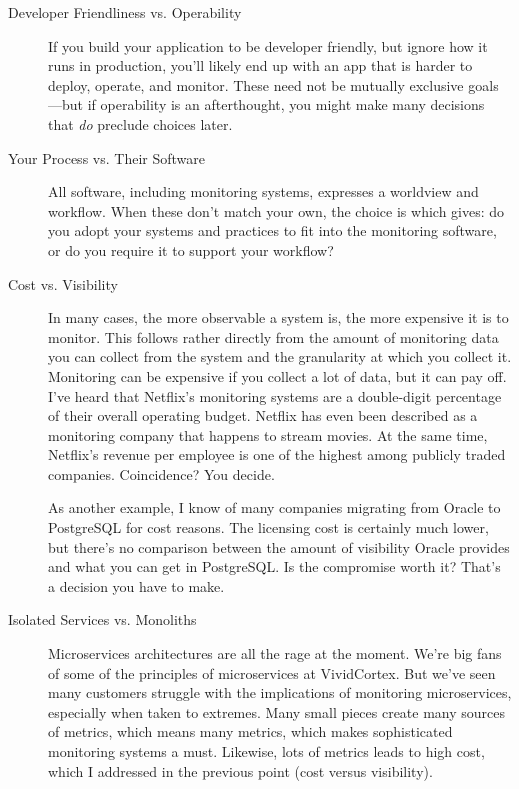 \documentclass{vivid_layout}
\begin{document}
\begin{description}

\item[Developer Friendliness vs. Operability] If you build your application to be
developer friendly, but ignore how it runs in production, you'll
likely end up with an app that is harder to deploy, operate, and monitor. These need not
be mutually exclusive goals---but if operability is an afterthought, you might
make many decisions that \emph{do} preclude choices later.

\item[Your Process vs. Their Software] All software, including monitoring
systems, expresses a worldview and workflow. When these don't match your own,
the choice is which gives: do you adopt your systems and practices to fit into
the monitoring software, or do you require it to support your workflow?

\item[Cost vs. Visibility] In many cases, the more observable a system is, the
more expensive it is to monitor. This follows rather directly from the amount of
monitoring data you can collect from the system and the granularity at which you
collect it. Monitoring can be expensive if you collect a lot of data, but it can
pay off. I've heard that Netflix's monitoring systems are a double-digit
percentage of their overall operating budget. Netflix has even been described as
a monitoring company that happens to stream movies. At the same time, Netflix's
revenue per employee is one of the highest among publicly traded companies.
Coincidence? You decide.

As another example, I know of many companies migrating from Oracle to PostgreSQL
for cost reasons. The licensing cost is certainly much lower, but there's 
no comparison between the amount of visibility Oracle provides and what you can
get in PostgreSQL. Is the compromise worth it? That's a decision you have to
make.

\item[Isolated Services vs. Monoliths] Microservices architectures are all the
rage at the moment. We're big fans of some of the principles of microservices at
VividCortex. But we've seen many customers struggle with the
implications of monitoring microservices, especially when taken to extremes.
Many small pieces create many sources of metrics, which means many metrics, which
makes sophisticated monitoring systems a must. Likewise, lots of metrics leads
to high cost, which I addressed in the previous point (cost versus
visibility).


\end{description}
\end{document}
